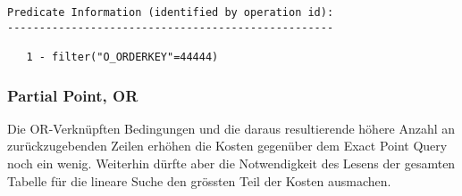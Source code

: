 \documentclass[11pt,a4paper,parskip=half]{scrartcl}
\begin{document}
\begin{lstlisting}
Predicate Information (identified by operation id):                                                                                                                                                                                                                                                          
---------------------------------------------------                                                                                                                                                                                                                                                          
                                                                                                                                                                                                                                                                                                             
   1 - filter("O_ORDERKEY"=44444) 
\end{lstlisting}

\subsubsection{Partial Point, OR}
\label{no-idx-sel-partial-or}
Die OR-Verknüpften Bedingungen und die daraus resultierende höhere Anzahl an zurückzugebenden Zeilen erhöhen die Kosten gegenüber dem Exact Point Query noch ein wenig. Weiterhin dürfte aber die Notwendigkeit des Lesens der gesamten Tabelle für die lineare Suche den grössten Teil der Kosten ausmachen.
\end{document}
